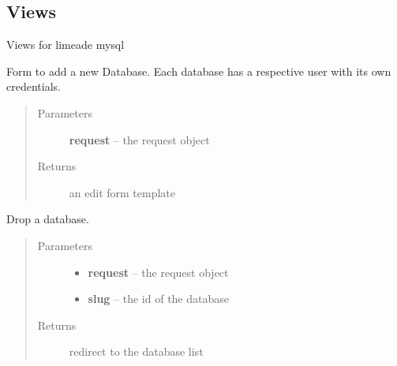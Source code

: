 \documentclass[letterpaper,10pt,english]{sphinxmanual}
\begin{document}
\subsection{Views}
\label{api/mysql:module-limeade.mysql.views}\label{api/mysql:views}
Views for limeade mysql

\begin{fulllineitems}
\label{api/mysql:limeade.mysql.views.db_add}
Form to add a new Database. Each database has a respective user with its 
own credentials.
\begin{quote}\begin{description}
\item[{Parameters}] \leavevmode
\textbf{request} -- the request object

\item[{Returns}] \leavevmode
an edit form template

\end{description}\end{quote}

\end{fulllineitems}


\begin{fulllineitems}
\label{api/mysql:limeade.mysql.views.db_delete}
Drop a database.
\begin{quote}\begin{description}
\item[{Parameters}] \leavevmode\begin{itemize}
\item {} 
\textbf{request} -- the request object

\item {} 
\textbf{slug} -- the id of the database

\end{itemize}

\item[{Returns}] \leavevmode
redirect to the database list

\end{description}\end{quote}

\end{fulllineitems}
\end{document}
